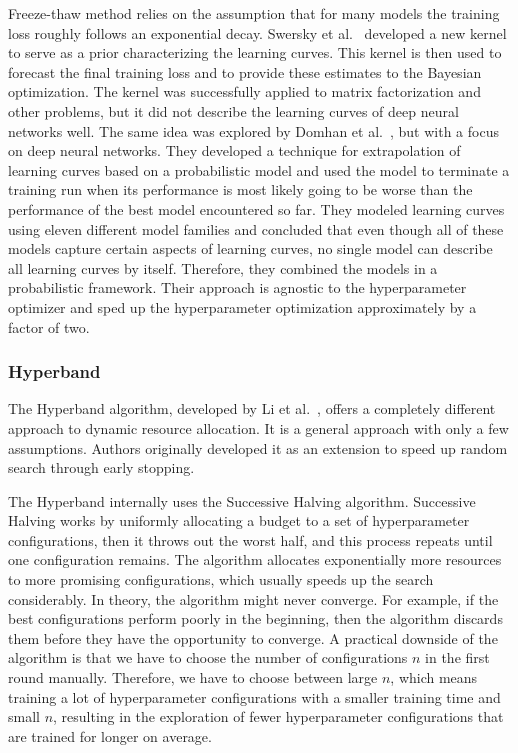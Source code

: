 Freeze-thaw method relies on the assumption that for many models the training loss roughly follows an exponential decay. Swersky et al.~\cite{swersky2014freeze} developed a new kernel to serve as a prior characterizing the learning curves. This kernel is then used to forecast the final training loss and to provide these estimates to the Bayesian optimization. The kernel was successfully applied to matrix factorization and other problems, but it did not describe the learning curves of deep neural networks well. The same idea was explored by Domhan et al.~\cite{domhan2015speeding}, but with a focus on deep neural networks. They developed a technique for extrapolation of learning curves based on a probabilistic model and used the model to terminate a training run when its performance is most likely going to be worse than the performance of the best model encountered so far. They modeled learning curves using eleven different model families and concluded that even though all of these models capture certain aspects of learning curves, no single model can describe all learning curves by itself. Therefore, they combined the models in a probabilistic framework. Their approach is agnostic to the hyperparameter optimizer and sped up the hyperparameter optimization approximately by a factor of two.

\subsubsection{Hyperband}
The Hyperband algorithm, developed by Li et al.~\cite{li2018hyperband}, offers a completely different approach to dynamic resource allocation. It is a general approach with only a few assumptions. Authors originally developed it as an extension to speed up random search through early stopping.

The Hyperband internally uses the Successive Halving algorithm. Successive Halving works by uniformly allocating a budget to a set of hyperparameter configurations, then it throws out the worst half, and this process repeats until one configuration remains. The algorithm allocates exponentially more resources to more promising configurations, which usually speeds up the search considerably. In theory, the algorithm might never converge. For example, if the best configurations perform poorly in the beginning, then the algorithm discards them before they have the opportunity to converge. A practical downside of the algorithm is that we have to choose the number of configurations $n$ in the first round manually. Therefore, we have to choose between large $n$, which means training a lot of hyperparameter configurations with a smaller training time and small $n$, resulting in the exploration of fewer hyperparameter configurations that are trained for longer on average.

